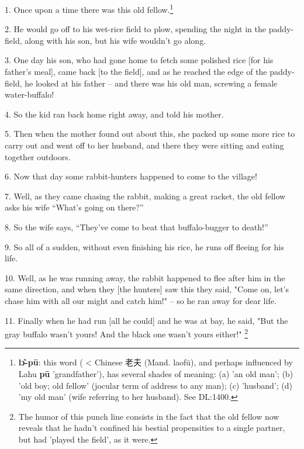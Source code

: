 \setcounter{footnote}{0}

1. Once upon a time there was this old fellow.\footnote{\textbf{lɔ̂-pū}: this word ( < Chinese 老夫 (Mand. laofū), and perhaps influenced by Lahu \textbf{pū} 'grandfather'), has several shades of meaning: (a) 'an old man'; (b) 'old boy; old fellow' (jocular term of address to any man); (c) 'husband'; (d) 'my old man' (wife referring to her husband). See DL:1400.}

2. He would go off to his wet-rice field to plow, spending the night in the paddy-field,
along with his son, but his wife wouldn't go along.

3. One day his son, who had gone home to fetch some polished rice [for his father's
meal], came back [to the field], and as he reached the edge of the paddy-field,
he looked at his father -- and there was his old man, screwing a female water-buffalo!

4. So the kid ran back home right away, and told his mother.

5. Then when the mother found out about this, she packed up some more rice to carry
out and went off to her husband, and there they were sitting and eating together
outdoors.

6. Now that day some rabbit-hunters happened to come to the village!

7. Well, as they came chasing the rabbit, making a great racket, the old fellow
asks his wife ``What's going on there?''

8. So the wife says, ``They've come to beat that buffalo-bugger to death!''

9. So all of a sudden, without even finishing his rice, he runs off fleeing for
his life.

10. Well, as he was running away, the rabbit happened to flee after him in the
same direction, and when they [the hunters] saw this they said, "Come
on, let's chase him with all our might and catch him!" -- so he ran away
for dear life.

11. Finally when he had run [all he could] and he was at bay, he said, "But
the gray buffalo wasn't yours! And the black one wasn't yours either!"
\footnote{The humor of this punch line consists in the fact that the old fellow now reveals that he hadn't confined his bestial propensities to a single partner, but had 'played the field', as it were.}

